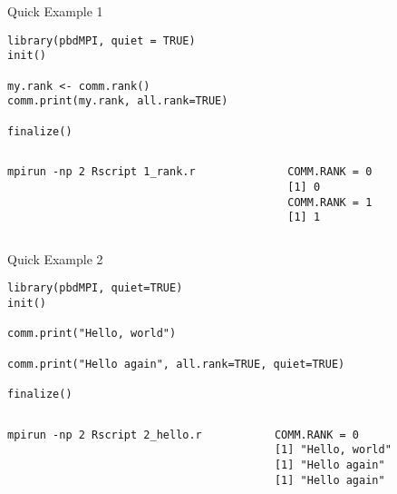 \begin{frame}[fragile]
  \begin{exampleblock}{Quick Example 1}
  \centering
\begin{lstlisting}[title=Rank Query: 1\_rank.r]
library(pbdMPI, quiet = TRUE)
init()

my.rank <- comm.rank()
comm.print(my.rank, all.rank=TRUE)

finalize()
\end{lstlisting}
  \begin{columns}[t,onlytextwidth]
    \begin{column}{0.62\textwidth}
\begin{lstlisting}[backgroundcolor=\color{white},keywordstyle=\color{black},title=Execute this script via:]
mpirun -np 2 Rscript 1_rank.r
\end{lstlisting}    
    \end{column}
    \hfill
    \begin{column}{0.35\textwidth}
\begin{lstlisting}[title=Sample Output:]
COMM.RANK = 0
[1] 0
COMM.RANK = 1
[1] 1
\end{lstlisting}
    \end{column}
​  \end{columns}
  \end{exampleblock}
\end{frame}



\begin{frame}[fragile]
  \begin{exampleblock}{Quick Example 2}
\begin{lstlisting}[title=Hello World: 2\_hello.r]
library(pbdMPI, quiet=TRUE)
init()

comm.print("Hello, world")

comm.print("Hello again", all.rank=TRUE, quiet=TRUE)

finalize()
\end{lstlisting}
  \begin{columns}[t,onlytextwidth]
    \begin{column}{0.58\textwidth}
\begin{lstlisting}[backgroundcolor=\color{white},keywordstyle=\color{black},title=Execute this script via:]
mpirun -np 2 Rscript 2_hello.r
\end{lstlisting}    
    \end{column}
    \hfill
    \begin{column}{0.4\textwidth}
\begin{lstlisting}[title=Sample Output:]
COMM.RANK = 0
[1] "Hello, world"
[1] "Hello again"
[1] "Hello again"
\end{lstlisting}
    \end{column}
​  \end{columns}
  \end{exampleblock}
\end{frame}



